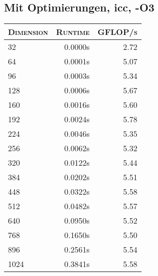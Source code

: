 \begin{table}[!htb]
\begin{minipage}{.5\linewidth}
\subsection{Mit Optimierungen, icc, -O3}
\begin{tabular}{|l|r|r|}
	\hline
	\textsc{Dimension} & \textsc{Runtime} & \textsc{GFLOP/s} \\
	\hline
	\hline
	32  &  0.0000s  & 2.72 \\ 
	\hline 
	64  &  0.0001s  & 5.07 \\ 
	\hline 
	96  &  0.0003s  & 5.34 \\ 
	\hline 
	128  &  0.0006s  & 5.67 \\ 
	\hline 
	160  &  0.0016s  & 5.60 \\ 
	\hline 
	192  &  0.0024s  & 5.78 \\ 
	\hline 
	224  &  0.0046s  & 5.35 \\ 
	\hline 
	256  &  0.0062s  & 5.32 \\ 
	\hline 
	320  &  0.0122s  & 5.44 \\ 
	\hline 
	384  &  0.0202s  & 5.51 \\ 
	\hline 
	448  &  0.0322s  & 5.58 \\ 
	\hline 
	512  &  0.0482s  & 5.57 \\ 
	\hline 
	640  &  0.0950s  & 5.52 \\ 
	\hline 
	768  &  0.1650s  & 5.50 \\ 
	\hline 
	896  &  0.2561s  & 5.54 \\ 
	\hline 
	1024  &  0.3841s  & 5.58 \\ 
	\hline 
\end{tabular}
\end{minipage}%
\end{table}
